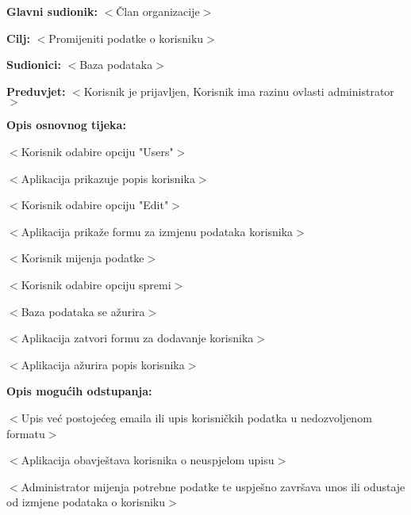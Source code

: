 					\noindent {}
					\begin{packed_item}

						\item \textbf{Glavni sudionik:} $<$Član organizacije$>$
						\item \textbf{Cilj:} $<$Promijeniti podatke o korisniku$>$
						\item \textbf{Sudionici:} $<$Baza podataka$>$
						\item \textbf{Preduvjet:} $<$Korisnik je prijavljen, Korisnik ima razinu ovlasti administrator$>$
						\item \textbf{Opis osnovnog tijeka:}

						\item[] \begin{packed_enum}

							\item $<$Korisnik odabire opciju "Users"$>$
							\item $<$Aplikacija prikazuje popis korisnika$>$
							\item $<$Korisnik odabire opciju "Edit"$>$
							\item $<$Aplikacija prikaže formu za izmjenu podataka korisnika$>$
							\item $<$Korisnik mijenja podatke$>$
							\item $<$Korisnik odabire opciju spremi$>$
							\item $<$Baza podataka se ažurira$>$
							\item $<$Aplikacija zatvori formu za dodavanje korisnika$>$
							\item $<$Aplikacija ažurira popis korisnika$>$
						\end{packed_enum}

						\item \textbf{Opis mogućih odstupanja:}

						\item[] \begin{packed_item}

							\item[2.f] $<$Upis već postojećeg emaila ili upis korisničkih
							podatka u nedozvoljenom formatu$>$
							\item[] \begin{packed_enum}

								\item $<$Aplikacija obavještava korisnika o neuspjelom upisu$>$
								\item $<$Administrator mijenja potrebne podatke te uspješno završava unos ili
								odustaje od izmjene podataka o korisniku$>$

							\end{packed_enum}

						\end{packed_item}
					\end{packed_item}

